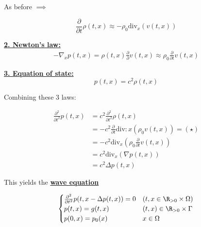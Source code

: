 As before $\implies$ 

\[\frac{\partial}{\partial t}\rho(t,x)\approx -\rho_0 \text{div}_x(v(t,x))\]

\underline{\textbf{2. Newton's law:}} 
\begin{align*}
    -\nabla_x p(t,x)=\rho(t,x)\frac{\partial}{\partial}v(t,x)\approx \rho_0\frac{\partial}{\partial t}v(t,x)
\end{align*} 

\underline{\textbf{3. Equation of state: }} 
\[p(t,x)=c^2\rho(t,x)\]

Combining these 3 laws:

\begin{align*}
    \frac{\partial^2}{\partial t^2}p(t,x)&=c^2\frac{\partial^2}{\partial t^2}\rho(t,x) \\
    &= -c^2 \frac{\partial}{\partial t}\text{div}:x(\rho_0 v(t,x)) = (\star) \\
    &=-c^2 \text{div}_x(\rho_0 \frac{\partial}{\partial t} v(t,x))\\
    &=c^2\text{div}_x(\nabla p(t,x))\\
    &= c^2\Delta p(t,x)
\end{align*}


This yields the \underline{\textbf{wave equation}}

\[\begin{cases}
    \frac{\partial^2}{\partial t^2}p(t,x-\Delta p(t,x))=0 & (t,x\in\R_{>0}\times \Omega)\\
    p(t,x)=g(t,x) & (t,x)\in\R_{>0}\times \Gamma\\
    p(0,x)=p_0(x) & x\in \Omega
\end{cases}\]




